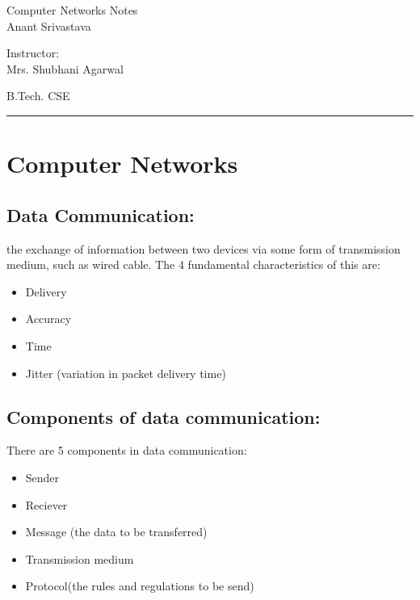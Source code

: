 \documentclass[11pt,letterpaper]{article}
\begin{document}
\begin{center}
  \Huge{Computer Networks Notes}\\
  \vspace{0.25cm}
  \small{Anant Srivastava}
\end{center}

\vspace{-1.75cm}

\begin{flushright}
  Instructor: \\ Mrs. Shubhani Agarwal
\end{flushright}

\vspace{-1.3cm}

\begin{flushleft}
  B.Tech. CSE
\end{flushleft}

\rule{15.5cm}{0.1mm}%

\tableofcontents
\pagebreak


\section{Computer Networks}

\subsection{Data Communication:}

the exchange of information between two devices via some form of transmission medium, such as wired cable. The 4 fundamental characteristics of this are:
\begin{itemize}
  \item Delivery
  \item Accuracy
  \item Time
  \item Jitter (variation in packet delivery time)
\end{itemize}

\subsection{Components of data communication:}
There are 5 components in data communication: 
\begin{itemize}
  \item Sender
  \item Reciever
  \item Message (the data to be transferred)
  \item Transmission medium
  \item Protocol(the rules and regulations to be send)
\end{itemize}
\end{document}
